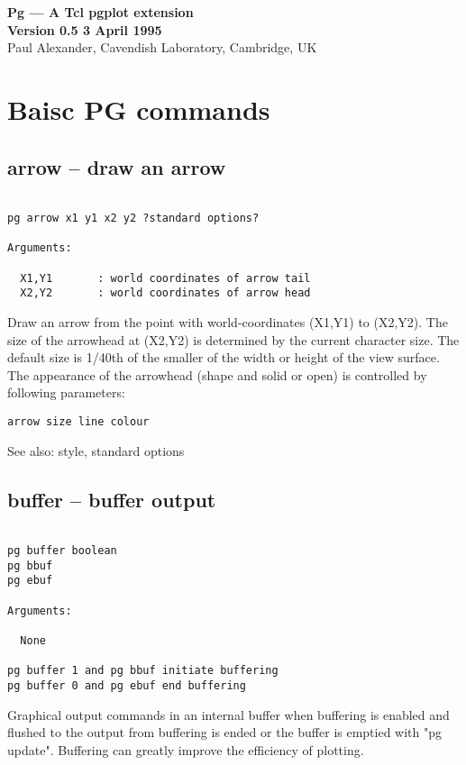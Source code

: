 


\begin{center}
{\large \bf Pg --- A Tcl pgplot extension} \\
\vspace{0.5cm}
{\large \bf Version 0.5 3 April 1995} \\
\vspace{0.5cm}
{\large Paul Alexander, Cavendish Laboratory, Cambridge, UK}\\
\end{center}

\section{Baisc PG commands}

\subsection{arrow -- draw an arrow}
\begin{verbatim}

pg arrow x1 y1 x2 y2 ?standard options?

Arguments:

  X1,Y1       : world coordinates of arrow tail
  X2,Y2       : world coordinates of arrow head
\end{verbatim}
Draw an arrow from the point with world-coordinates (X1,Y1) to
(X2,Y2). The size of the arrowhead at (X2,Y2) is determined by
the current character size.  The default size is 1/40th of the 
smaller of the width or height of the view surface.  The appearance 
of the arrowhead (shape and solid or open) is controlled by following
parameters:
\begin{verbatim}
arrow size line colour
\end{verbatim}
See also: style, standard options


\subsection{buffer -- buffer output}
\begin{verbatim}

pg buffer boolean
pg bbuf
pg ebuf

Arguments:

  None

pg buffer 1 and pg bbuf initiate buffering
pg buffer 0 and pg ebuf end buffering
\end{verbatim}
Graphical output commands in an internal buffer when buffering
is enabled and flushed to the output from buffering is ended or
the buffer is emptied with "pg update". Buffering can greatly
improve the efficiency of plotting.

